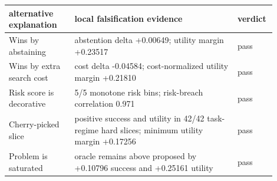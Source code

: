 \begin{tabular}{p{0.23\linewidth}p{0.58\linewidth}p{0.09\linewidth}}
\toprule
alternative explanation & local falsification evidence & verdict \\
\midrule
Wins by abstaining & abstention delta +0.00649; utility margin +0.23517 & pass \\
Wins by extra search cost & cost delta -0.04584; cost-normalized utility margin +0.21810 & pass \\
Risk score is decorative & 5/5 monotone risk bins; risk-breach correlation 0.971 & pass \\
Cherry-picked slice & positive success and utility in 42/42 task-regime hard slices; minimum utility margin +0.17256 & pass \\
Problem is saturated & oracle remains above proposed by +0.10796 success and +0.25161 utility & pass \\
\bottomrule
\end{tabular}
